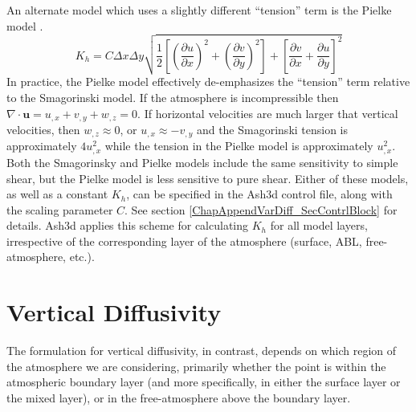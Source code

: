 An alternate model which uses a slightly different ``tension'' term is the Pielke model \cite{Pielke1974}.
\begin{equation}\label{VarDiff_Eq_Pielke}
K_h = C \Delta x \Delta y \sqrt{
\frac{1}{2}\left[ \left(\frac{\partial u}{\partial x}\right)^2 + \left(\frac{\partial v}{\partial y}\right)^2 \right]
+ \left[ \frac{\partial v}{\partial x} +\frac{\partial u}{\partial y} \right]^2}
\end{equation}
In practice, the Pielke model effectively de-emphasizes the ``tension'' term relative to
the Smagorinski model. If the atmosphere is incompressible then $\nabla \cdot \mathbf{u}=u_{,x}+v_{,y}+w_{,z}=0$.
If horizontal velocities are much larger that vertical velocities, then 
$w_{,z}\approx 0$, or $u_{,x} \approx - v_{,y}$ and the Smagorinski tension is
approximately $4 u_{,x}^2$ while the tension in the Pielke model is approximately $u_{,x}^2$.
Both the Smagorinsky and Pielke models include the same sensitivity to simple shear, but
the Pielke model is less sensitive to pure shear. Either of these models, as well as
a constant $K_h$, can be specified in the Ash3d control file, along with the scaling
parameter $C$. See section \ref{ChapAppendVarDiff_SecContrlBlock} for details. Ash3d
applies this scheme for calculating $K_h$ for all model layers, irrespective of the
corresponding layer of the atmosphere (surface, ABL, free-atmosphere, etc.).

\section{Vertical Diffusivity}\label{ChapAppendVarDiff_Sec_Kv}
The formulation for vertical diffusivity, in contrast, depends on which region of the atmosphere
we are considering, primarily whether the point is within the atmospheric boundary
layer (and more specifically, in either the surface layer or the mixed layer),
or in the free-atmosphere above the boundary layer.

